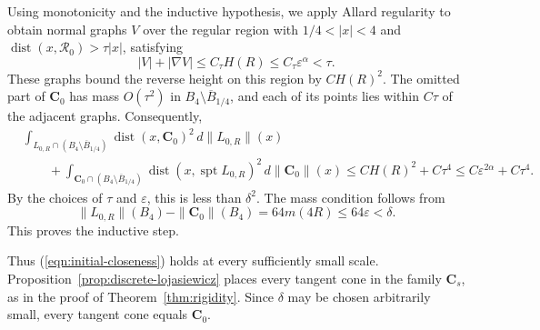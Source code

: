 \documentclass[11pt,a4paper]{article}
\numberwithin{equation}{section}
\theoremstyle{definition}
\theoremstyle{remark}
\newcommand{\dist}{\operatorname{dist}}
\begin{document}
	Using monotonicity and the inductive hypothesis, we apply Allard regularity
	to obtain
	normal graphs $V$ over the regular region with $1/4<|x|<4$ and
	$\dist(x,\mathcal R_0)>\tau|x|$, satisfying
	\[
	|V|+|\nabla V|\le C_\tau H(R)\le C_\tau\varepsilon^\alpha<\tau.
	\]
	These graphs bound the reverse height on this region by $CH(R)^2$.
	The omitted part of $\mathbf C_0$ has mass
	$O(\tau^2)$ in $B_4\setminus\overline B_{1/4}$, and each of its points
	lies within $C\tau$ of the adjacent graphs.
	Consequently,
	\[
	\begin{aligned}
		&\int_{L_{0,R}\cap(B_4\setminus\overline B_{1/4})}
		\dist(x,\mathbf C_0)^2\,d\|L_{0,R}\|(x)\\
		&\qquad+\int_{\mathbf C_0\cap(B_4\setminus\overline B_{1/4})}
		\dist(x,\operatorname{spt}L_{0,R})^2\,d\|\mathbf C_0\|(x)
		\le CH(R)^2+C\tau^4
		\le C\varepsilon^{2\alpha}+C\tau^4.
	\end{aligned}
	\]
	By the choices of $\tau$ and $\varepsilon$, this is less than $\delta^2$.
	The mass condition follows from
	\[
	\|L_{0,R}\|(B_4)-\|\mathbf C_0\|(B_4)
	=64m(4R)\le64\varepsilon<\delta.
	\]
	This proves the inductive step.
	
	Thus (\ref{eqn:initial-closeness}) holds at every sufficiently small
	scale. Proposition~\ref{prop:discrete-lojasiewicz} places every tangent
	cone in the family $\mathbf C_s$, as in the proof of
	Theorem~\ref{thm:rigidity}. Since $\delta$ may be chosen arbitrarily
	small, every tangent cone equals $\mathbf C_0$.
	
\end{document}
